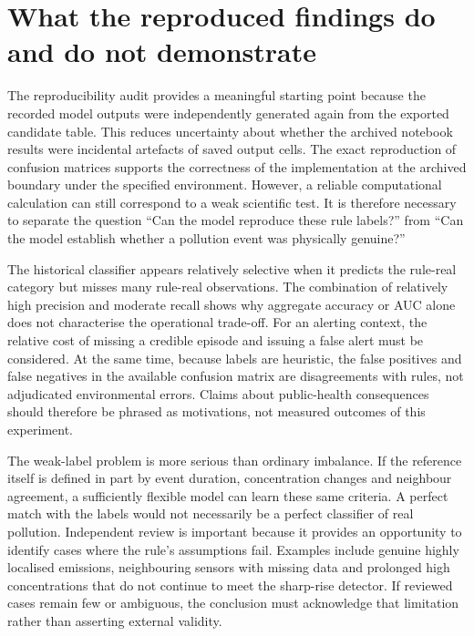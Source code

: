 \documentclass[12pt,a4paper,oneside]{report}
\begin{document}
\section{What the reproduced findings do and do not demonstrate}
The reproducibility audit provides a meaningful starting point because the recorded model outputs were independently generated again from the exported candidate table. This reduces uncertainty about whether the archived notebook results were incidental artefacts of saved output cells. The exact reproduction of confusion matrices supports the correctness of the implementation at the archived boundary under the specified environment. However, a reliable computational calculation can still correspond to a weak scientific test. It is therefore necessary to separate the question ``Can the model reproduce these rule labels?'' from ``Can the model establish whether a pollution event was physically genuine?''

The historical classifier appears relatively selective when it predicts the rule-real category but misses many rule-real observations. The combination of relatively high precision and moderate recall shows why aggregate accuracy or AUC alone does not characterise the operational trade-off. For an alerting context, the relative cost of missing a credible episode and issuing a false alert must be considered. At the same time, because labels are heuristic, the false positives and false negatives in the available confusion matrix are disagreements with rules, not adjudicated environmental errors. Claims about public-health consequences should therefore be phrased as motivations, not measured outcomes of this experiment.

The weak-label problem is more serious than ordinary imbalance. If the reference itself is defined in part by event duration, concentration changes and neighbour agreement, a sufficiently flexible model can learn these same criteria. A perfect match with the labels would not necessarily be a perfect classifier of real pollution. Independent review is important because it provides an opportunity to identify cases where the rule's assumptions fail. Examples include genuine highly localised emissions, neighbouring sensors with missing data and prolonged high concentrations that do not continue to meet the sharp-rise detector. If reviewed cases remain few or ambiguous, the conclusion must acknowledge that limitation rather than asserting external validity.
\end{document}

